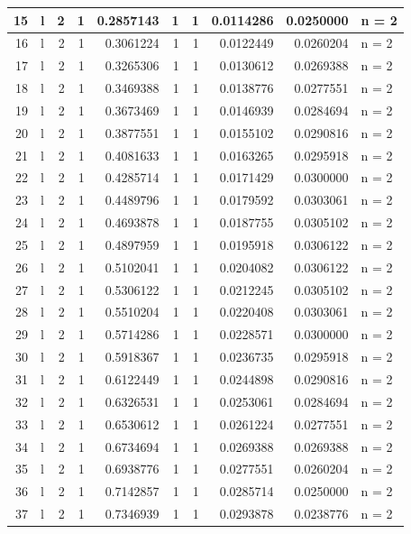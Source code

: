 \documentclass[
  letterpaper,
  DIV=11,
  numbers=noendperiod]{scrreprt}
\begin{document}
\begin{table}
\begin{tabular}[t]{r|l|r|r|r|r|r|r|r|l}
\hline
15 & l & 2 & 1 & 0.2857143 & 1 & 1 & 0.0114286 & 0.0250000 & n = 2\\
\hline
16 & l & 2 & 1 & 0.3061224 & 1 & 1 & 0.0122449 & 0.0260204 & n = 2\\
\hline
17 & l & 2 & 1 & 0.3265306 & 1 & 1 & 0.0130612 & 0.0269388 & n = 2\\
\hline
18 & l & 2 & 1 & 0.3469388 & 1 & 1 & 0.0138776 & 0.0277551 & n = 2\\
\hline
19 & l & 2 & 1 & 0.3673469 & 1 & 1 & 0.0146939 & 0.0284694 & n = 2\\
\hline
20 & l & 2 & 1 & 0.3877551 & 1 & 1 & 0.0155102 & 0.0290816 & n = 2\\
\hline
21 & l & 2 & 1 & 0.4081633 & 1 & 1 & 0.0163265 & 0.0295918 & n = 2\\
\hline
22 & l & 2 & 1 & 0.4285714 & 1 & 1 & 0.0171429 & 0.0300000 & n = 2\\
\hline
23 & l & 2 & 1 & 0.4489796 & 1 & 1 & 0.0179592 & 0.0303061 & n = 2\\
\hline
24 & l & 2 & 1 & 0.4693878 & 1 & 1 & 0.0187755 & 0.0305102 & n = 2\\
\hline
25 & l & 2 & 1 & 0.4897959 & 1 & 1 & 0.0195918 & 0.0306122 & n = 2\\
\hline
26 & l & 2 & 1 & 0.5102041 & 1 & 1 & 0.0204082 & 0.0306122 & n = 2\\
\hline
27 & l & 2 & 1 & 0.5306122 & 1 & 1 & 0.0212245 & 0.0305102 & n = 2\\
\hline
28 & l & 2 & 1 & 0.5510204 & 1 & 1 & 0.0220408 & 0.0303061 & n = 2\\
\hline
29 & l & 2 & 1 & 0.5714286 & 1 & 1 & 0.0228571 & 0.0300000 & n = 2\\
\hline
30 & l & 2 & 1 & 0.5918367 & 1 & 1 & 0.0236735 & 0.0295918 & n = 2\\
\hline
31 & l & 2 & 1 & 0.6122449 & 1 & 1 & 0.0244898 & 0.0290816 & n = 2\\
\hline
32 & l & 2 & 1 & 0.6326531 & 1 & 1 & 0.0253061 & 0.0284694 & n = 2\\
\hline
33 & l & 2 & 1 & 0.6530612 & 1 & 1 & 0.0261224 & 0.0277551 & n = 2\\
\hline
34 & l & 2 & 1 & 0.6734694 & 1 & 1 & 0.0269388 & 0.0269388 & n = 2\\
\hline
35 & l & 2 & 1 & 0.6938776 & 1 & 1 & 0.0277551 & 0.0260204 & n = 2\\
\hline
36 & l & 2 & 1 & 0.7142857 & 1 & 1 & 0.0285714 & 0.0250000 & n = 2\\
\hline
37 & l & 2 & 1 & 0.7346939 & 1 & 1 & 0.0293878 & 0.0238776 & n = 2\\

\end{tabular}
\end{table}
\end{document}
